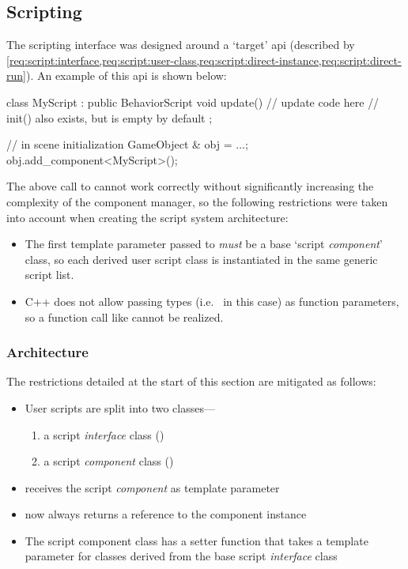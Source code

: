 \documentclass{projdoc}
\begin{document}
\subsection{Scripting}

The scripting interface was designed around a `target' \gls{api} (described by
\cref{req:script:interface,req:script:user-class,req:script:direct-instance,req:script:direct-run}).
An example of this \gls{api} is shown below:\noparbreak

\begin{blockcode}
class MyScript : public BehaviorScript {
	void update() {
		// update code here
	}
	// init() also exists, but is empty by default
};

{ // in scene initialization
	GameObject & obj = ...;
	obj.add_component<MyScript>();
}
\end{blockcode}

The above call to  cannot work correctly
without significantly increasing the complexity of the component manager, so the
following restrictions were taken into account when creating the script system
architecture:\noparbreak

\begin{itemize}
	\item The first template parameter passed to 
		\emph{must} be a base `script \emph{component}' class, so each derived user
		script class is instantiated in the same generic script list.
	\item C++ does not allow passing types (i.e.~ in this case) as
		function parameters, so a function call like
		 cannot be realized.
\end{itemize}

\subsubsection{Architecture}

The restrictions detailed at the start of this section are mitigated as
follows:\noparbreak

\begin{itemize}
	\item User scripts are split into two classes---
		\begin{enumerate}
			\item a script \emph{interface} class ()
			\item a script \emph{component} class ()
		\end{enumerate}
	\item {} receives the script \emph{component}
		as template parameter
	\item {} now always returns a reference to the
		component instance
	\item The script component class has a setter function that takes a template
		parameter for classes derived from the base script \emph{interface} class
\end{itemize}
\end{document}
